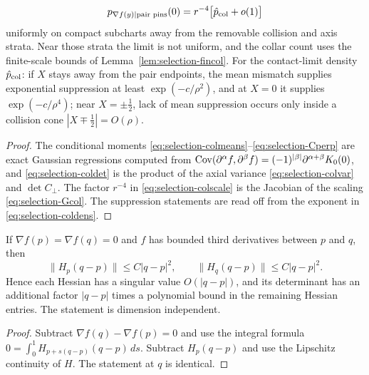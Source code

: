 \begin{lemma}
\begin{equation}
p_{\nabla f(y)\mid\text{pair pins}}(0)=r^{-4}\bigl[\hat p_{\rm col}+o(1)\bigr]
\end{equation}
uniformly on compact subcharts away from the removable collision and axis strata. Near those strata the limit is not uniform, and the collar count uses the finite-scale bounds of Lemma~\ref{lem:selection-fincol}. For the contact-limit density $\hat p_{\rm col}$: if $X$ stays away from the pair endpoints, the mean mismatch supplies exponential suppression at least $\exp(-c/\rho^2)$, and at $X=0$ it supplies $\exp(-c/\rho^4)$; near $X=\pm\frac12$, lack of mean suppression occurs only inside a collision cone $|X\mp\frac12|=O(\rho)$.
\end{lemma}

\begin{proof}
The conditional moments \eqref{eq:selection-colmeans}--\eqref{eq:selection-Cperp} are exact Gaussian regressions computed from $\operatorname{Cov}(\partial^\alpha f,\partial^\beta f)=(-1)^{|\beta|}\partial^{\alpha+\beta}K_0(0)$, and \eqref{eq:selection-coldet} is the product of the axial variance \eqref{eq:selection-colvar} and $\det C_\perp$. The factor $r^{-4}$ in \eqref{eq:selection-colscale} is the Jacobian of the scaling \eqref{eq:selection-Gcol}. The suppression statements are read off from the exponent in \eqref{eq:selection-coldens}.
\end{proof}

\begin{lemma}\label{lem:selection-collision}
If $\nabla f(p)=\nabla f(q)=0$ and $f$ has bounded third derivatives between $p$ and $q$, then
\begin{equation}\label{eq:selection-collision}
\|H_p(q-p)\|\le C|q-p|^2,\qquad\|H_q(q-p)\|\le C|q-p|^2 .
\end{equation}
Hence each Hessian has a singular value $O(|q-p|)$, and its determinant has an additional factor $|q-p|$ times a polynomial bound in the remaining Hessian entries. The statement is dimension independent.
\end{lemma}

\begin{proof}
Subtract $\nabla f(q)-\nabla f(p)=0$ and use the integral formula $0=\int_0^1H_{p+s(q-p)}(q-p)\,ds$. Subtract $H_p(q-p)$ and use the Lipschitz continuity of $H$. The statement at $q$ is identical.
\end{proof}

